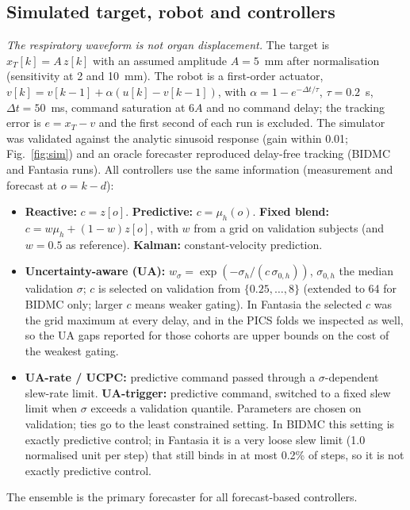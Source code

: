 \documentclass[conference]{IEEEtran}
\begin{document}
\subsection{Simulated target, robot and controllers}
\emph{The respiratory waveform is not organ displacement.} The target is $x_T[k]=A\,z[k]$ with an assumed amplitude $A=5$~mm after normalisation (sensitivity at 2 and 10~mm). The robot is a first-order actuator, $v[k]=v[k-1]+\alpha(u[k]-v[k-1])$, with $\alpha=1-e^{-\Delta t/\tau}$, $\tau=0.2$~s, $\Delta t=50$~ms, command saturation at $6A$ and no command delay; the tracking error is $e=x_T-v$ and the first second of each run is excluded. The simulator was validated against the analytic sinusoid response %
(gain within 0.01; Fig.~\ref{fig:sim}) and an oracle forecaster reproduced delay-free tracking (BIDMC and Fantasia runs). All controllers use the same information (measurement and forecast at $o=k-d$):
\begin{itemize}
\item \textbf{Reactive:} $c=z[o]$. \textbf{Predictive:} $c=\mu_h(o)$. \textbf{Fixed blend:} $c=w\mu_h+(1-w)z[o]$, with $w$ from a grid on validation subjects (and $w=0.5$ as reference). \textbf{Kalman:} constant-velocity prediction.
\item \textbf{Uncertainty-aware (UA):} $w_\sigma=\exp(-\sigma_h/(c\,\sigma_{0,h}))$, $\sigma_{0,h}$ the median validation $\sigma$; $c$ is selected on validation from $\{0.25,\ldots,8\}$ %
(extended to 64 for BIDMC only; larger $c$ means weaker gating). In Fantasia the selected $c$ was the grid maximum at every delay, and in the PICS folds we inspected as well, so the UA gaps reported for those cohorts are upper bounds on the cost of the weakest gating.
\item \textbf{UA-rate / UCPC:} predictive command passed through a $\sigma$-dependent slew-rate limit. \textbf{UA-trigger:} predictive command, switched to a fixed slew limit when $\sigma$ exceeds a validation quantile. Parameters are chosen on validation; ties go to the least constrained setting. In BIDMC this setting is exactly predictive control; in Fantasia it is a very loose slew limit (1.0 normalised unit per step) that still binds in at most 0.2\% of steps, so it is not exactly predictive control.
\end{itemize}
The ensemble is the primary forecaster for all forecast-based controllers.
\end{document}
